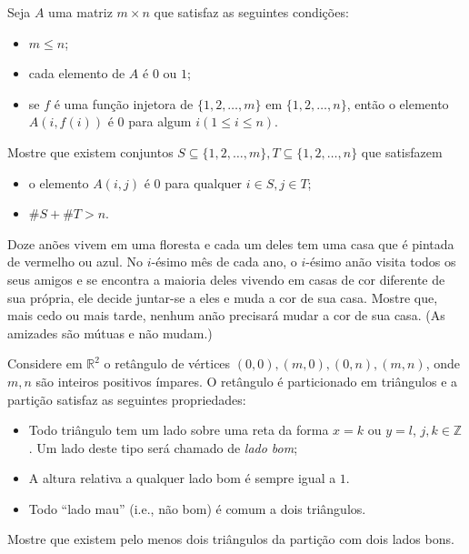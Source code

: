 \begin{questao}
  Seja $A$ uma matriz $m \times n$ que satisfaz as
  seguintes condições:

  \begin{itemize}
    \item $m \leq n$;

    \item cada elemento de $A$ é $0$ ou $1$;

    \item se $f$ é uma função injetora de $\{1,2,\ldots,m\}$ em
    $\{1,2,\ldots,n\}$, então o elemento $A(i,f(i))$ é $0$ para
    algum $i (1 \leq i \leq n)$.
  \end{itemize}

  Mostre que existem conjuntos
  $S \subseteq \{1,2,\ldots,m\}, T \subseteq \{1,2,\ldots,n\}$ que satisfazem

  \begin{itemize}
    \item o elemento $A(i,j)$ é $0$ para qualquer $i \in S, j \in
    T$;

    \item $\#S + \#T > n$.
  \end{itemize}
\end{questao}

\begin{questao}
  Doze anões vivem em uma floresta e cada um deles tem uma
  casa que é pintada de vermelho ou azul. No $i$-ésimo mês de cada
  ano, o $i$-ésimo anão visita todos os seus amigos e se encontra a
  maioria deles vivendo em casas de cor diferente de sua própria, ele
  decide juntar-se a eles e muda a cor de sua casa. Mostre que, mais
  cedo ou mais tarde, nenhum anão precisará mudar a cor de sua
  casa. (As amizades são mútuas e não mudam.)
\end{questao}

\begin{questao}
  Considere em $\mathbb{R}^2$ o retângulo de vértices
  $(0,0), (m,0), (0,n), (m,n)$, onde $m,n$ são inteiros positivos
  ímpares. O retângulo é particionado em triângulos e a partição
  satisfaz as seguintes propriedades:

  \begin{itemize}
    \item Todo triângulo tem um lado sobre uma reta da forma $x=k$ ou
    $y=l$, $j,k \in \mathbb{Z}$. Um lado deste tipo será chamado
    de {\it lado bom};

    \item A altura relativa a qualquer lado bom é sempre igual a $1$.

    \item Todo ``lado mau'' (i.e., não bom) é comum a dois triângulos.
  \end{itemize}

  Mostre que existem pelo menos dois triângulos da partição com dois
  lados bons.
\end{questao}

